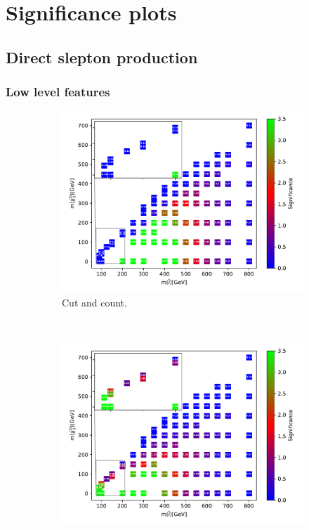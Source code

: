\chapter{Significance plots}
\label{sec:appsignificance}

\newpage

\section{Direct slepton production}

\subsection{Low level features}



\begin{figure}[H]
    \centering
    \begin{subfigure}[t!]{0.49\textwidth}
    \includegraphics[width = \textwidth]{Figures/Significances/significanceCutandCount_slepslep_all.pdf}
    \caption{Cut and count.}
        \label{fig:signLowSlepSlepcandc}
    \end{subfigure}
    \\
    \begin{subfigure}[t!]{0.49\textwidth}
    \includegraphics[width = \textwidth]{Figures/Significances/significance_BDT_slepslep_Low_level.pdf}

\end{subfigure}
\end{figure}
